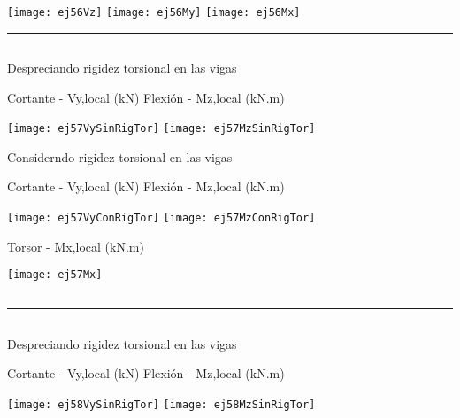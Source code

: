 \texttt{[image: ej56Vz]}
\texttt{[image: ej56My]}
\texttt{[image: ej56Mx]}

\hrule

\subsection{}

Despreciando rigidez torsional en las vigas

\noindent
Cortante - Vy,local (kN)
\hfill
Flexión - Mz,local (kN.m)

\texttt{[image: ej57VySinRigTor]}
\texttt{[image: ej57MzSinRigTor]}


Considerndo rigidez torsional en las vigas


\noindent
Cortante - Vy,local (kN)
\hfill
Flexión - Mz,local (kN.m)


\texttt{[image: ej57VyConRigTor]}
\texttt{[image: ej57MzConRigTor]}

\begin{center}

Torsor - Mx,local (kN.m)

\texttt{[image: ej57Mx]}

\end{center}


\subsection{}

\begin{center}
	\def\svgwidth{0.8\textwidth}
	
\end{center}


\hrule




\subsection{}


Despreciando rigidez torsional en las vigas

\noindent
Cortante - Vy,local (kN)
\hfill
Flexión - Mz,local (kN.m)

\texttt{[image: ej58VySinRigTor]}
\texttt{[image: ej58MzSinRigTor]}


